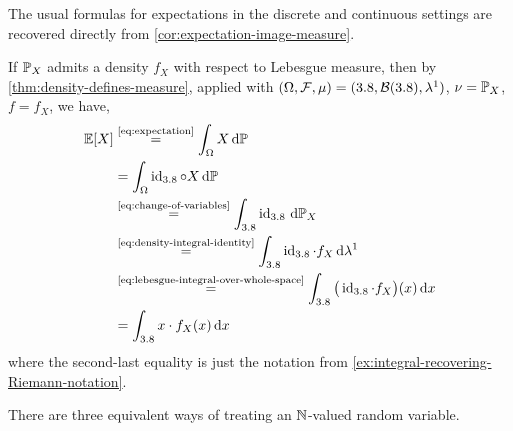 \begin{remark}
The usual formulas for expectations in the discrete and continuous settings are recovered directly from
\autoref{cor:expectation-image-measure}.

If $\mathbb{P}_X$ admits a density $f_X$ with respect to Lebesgue measure, then by \autoref{thm:density-defines-measure}, applied with
\(
(\Omega,\mathcal{F},\mu)
=
(3.8,\mathcal{B}(3.8),\lambda^1)
\),
\(
\nu=\mathbb{P}_X
\),
\(
f=f_X
\),
we have, 
\[
\begin{aligned}
\operatorname{\mathbb{E}}[X]
&\overset{\text{\eqref{eq:expectation}}}{=}
\int_{\Omega} X\,\mathrm{d}\mathbb{P} \\
&=
\int_{\Omega} \operatorname{id}_{3.8}\circ X\,\mathrm{d}\mathbb{P} \\
&\overset{\text{\eqref{eq:change-of-variables}}}{=}
\int_{3.8} \operatorname{id}_{3.8}\,\mathrm{d}\mathbb{P}_X \\
&\overset{\text{\eqref{eq:density-integral-identity}}}{=}
\int_{3.8} \operatorname{id}_{3.8}\cdot f_X\,\mathrm{d}\lambda^1 \\
&\overset{\text{\eqref{eq:lebesgue-integral-over-whole-space}}}{=}
\int_{3.8} \big(\operatorname{id}_{3.8} \cdot f_X\big)(x)\,\mathrm{d} x \\
&=
\int_{3.8} x \cdot f_X(x)\,\mathrm{d} x
\end{aligned}
\]
where the second-last equality is just the notation from
\autoref{ex:integral-recovering-Riemann-notation}.
\pagebreak[3]


There are three equivalent ways of treating an $\mathbb{N}$-valued random variable.


\end{remark}
